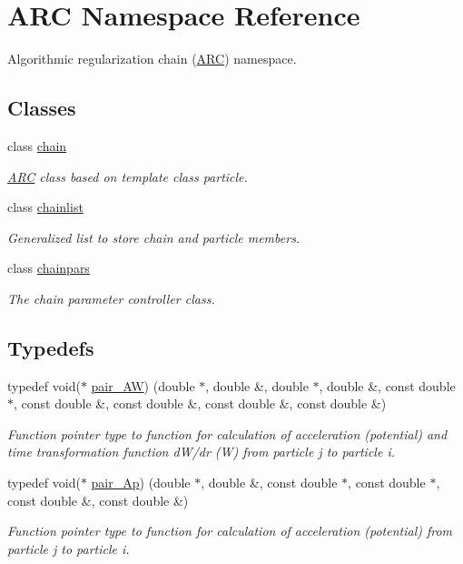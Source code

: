 \hypertarget{namespaceARC}{}\section{A\+RC Namespace Reference}
\label{namespaceARC}


Algorithmic regularization chain (\hyperlink{namespaceARC}{A\+RC}) namespace.  


\subsection*{Classes}
\begin{DoxyCompactItemize}
\item 
class \hyperlink{classARC_1_1chain}{chain}
\begin{DoxyCompactList}\small\item\em \hyperlink{namespaceARC}{A\+RC} class based on template class particle. \end{DoxyCompactList}\item 
class \hyperlink{classARC_1_1chainlist}{chainlist}
\begin{DoxyCompactList}\small\item\em Generalized list to store chain and particle members. \end{DoxyCompactList}\item 
class \hyperlink{classARC_1_1chainpars}{chainpars}
\begin{DoxyCompactList}\small\item\em The chain parameter controller class. \end{DoxyCompactList}\end{DoxyCompactItemize}
\subsection*{Typedefs}
\begin{DoxyCompactItemize}
\item 
typedef void($\ast$ \hyperlink{namespaceARC_adbfc7c72ce3d25363148027db0641abf}{pair\+\_\+\+AW}) (double $\ast$, double \&, double $\ast$, double \&, const double $\ast$, const double \&, const double \&, const double \&, const double \&)
\begin{DoxyCompactList}\small\item\em Function pointer type to function for calculation of acceleration (potential) and time transformation function d\+W/dr (W) from particle j to particle i. \end{DoxyCompactList}\item 
typedef void($\ast$ \hyperlink{namespaceARC_a819446c4644b3a3af7ef11574d0b55e0}{pair\+\_\+\+Ap}) (double $\ast$, double \&, const double $\ast$, const double $\ast$, const double \&, const double \&)
\begin{DoxyCompactList}\small\item\em Function pointer type to function for calculation of acceleration (potential) from particle j to particle i. \end{DoxyCompactList}\end{DoxyCompactItemize}
